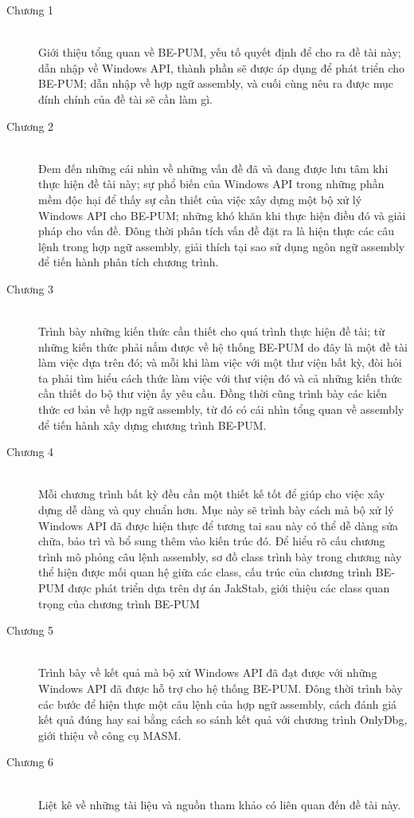 \begin{description}
  	\item[Chương 1] \hfill \\
	Giới thiệu tổng quan về BE-PUM, yếu tố quyết  định để cho ra đề tài này; dẫn nhập về Windows API, thành phần sẽ được áp dụng để phát triển cho BE-PUM; dẫn nhập về hợp ngữ assembly, và cuối cùng nêu ra được mục đính chính của đề tài sẽ cần làm gì. \\
 	\item[Chương 2] \hfill \\
	Đem đến những cái nhìn về những vấn đề đã và đang được lưu tâm khi thực hiện đề tài này; sự phổ biến của Windows API trong những phần mềm độc hại để thấy sự cần thiết của việc xây dựng một bộ xử lý Windows API cho BE-PUM; những khó khăn khi thực hiện điều đó và giải pháp cho vấn đề. Đông thời phân tích vấn đề đặt ra là hiện thực các câu lệnh trong hợp ngữ assembly, giải thích tại sao sử dụng ngôn ngữ assembly để tiến hành phân tích chương trình.\\
	\item[Chương 3] \hfill \\
	Trình bày những kiến thức cần thiết cho quá trình thực hiện đề tài; từ những kiến thức phải nắm được về hệ thống BE-PUM do đây là một đề tài làm việc dựa trên đó; và mỗi khi làm việc với một thư viện bất kỳ, đòi hỏi ta phải tìm hiểu cách thức làm việc với thư viện đó và cả những kiến thức cần thiết do bộ thư viện ấy yêu cầu. Đồng thời cũng trình bày các kiến thức cơ bản về hợp ngữ assembly, từ đó có cái nhìn tổng quan về assembly để tiến hành xây dựng chương trình BE-PUM. \\
	\item[Chương 4] \hfill \\
	Mỗi chương trình bất kỳ đều cần một thiết kế tốt để giúp cho việc xây dựng dễ dàng và quy chuẩn hơn. Mục này sẽ trình bày cách mà bộ xử lý Windows API đã được hiện thực để tương tai sau này có thể dễ dàng sửa chữa, bảo trì và bổ sung thêm vào kiến trúc đó. Để hiểu rõ cấu chương trình mô phỏng câu lệnh assembly, sơ đồ class trình bày trong chương này thể hiện được mối quan hệ giữa các class, cấu trúc của chương trình BE-PUM được phát triển dựa trên dự án JakStab, giới thiệu các class quan trọng của chương trình BE-PUM\\
	\item[Chương 5] \hfill \\
	 Trình bày về kết quả mà bộ xử Windows API đã đạt được với những Windows API đã được hỗ trợ cho hệ thống BE-PUM. Đông thời trình bày các bước để hiện thực một câu lệnh của hợp ngữ assembly, cách đánh giá kết quả đúng hay sai bằng cách so sánh kết quả với chương trình OnlyDbg, giới thiệu về công cụ MASM. \\
	\item[Chương 6] \hfill \\
	 Liệt kê về những tài liệu và nguồn tham khảo có liên quan đến đề tài này.\\
\end{description}
